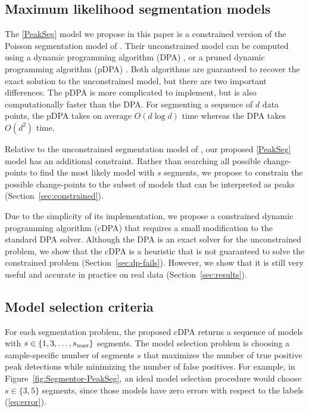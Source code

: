 \documentclass{article}
\begin{document}
\subsection{Maximum likelihood segmentation models}

The \ref{PeakSeg} model we propose in this paper is a constrained
version of the Poisson segmentation model of \citet{Segmentor}.
Their unconstrained model can be computed using a dynamic programming
algorithm (DPA) \citep{bellman}, or a pruned dynamic programming
algorithm (pDPA) \citep{pruned-dp}. Both algorithms are guaranteed to
recover the exact solution to the unconstrained model, but there are
two important differences. The pDPA is more complicated to implement,
but is also computationally faster than the DPA. For segmenting a
sequence of $d$ data points, the pDPA takes on average $O(d\log d)$
time whereas the DPA takes $O(d^2)$ time. 

Relative to the unconstrained segmentation model of \citet{Segmentor},
our proposed \ref{PeakSeg} model has an additional constraint. Rather
than searching all possible change-points to find the most likely
model with $s$ segments, we propose to constrain the possible
change-points to the subset of models that can be interpreted as peaks
(Section~\ref{sec:constrained}).

Due to the simplicity of its implementation, we propose a constrained
dynamic programming algorithm (cDPA) that requires a small
modification to the standard DPA solver. Although the DPA is an exact
solver for the unconstrained problem, we show that the cDPA is a
heuristic that is not guaranteed to solve the constrained
problem (Section~\ref{sec:dp-fails}). However, we show that it is
still very useful and accurate in practice on real data
(Section~\ref{sec:results}).

\subsection{Model selection criteria}

For each segmentation problem, the proposed cDPA returns a sequence of
models with $s\in\{1, 3, \dots, s_{\text{\text{max}}}\}$ segments. The
model selection problem is choosing a sample-specific number of
segments $s$ that maximizes the number of true positive peak
detections while minimizing the number of false positives. For
example, in Figure~\ref{fig:Segmentor-PeakSeg}, an ideal model
selection procedure would choose $s\in\{3, 5\}$ segments, since those
models have zero errors with respect to the labels (\ref{eq:error}).
\end{document}
